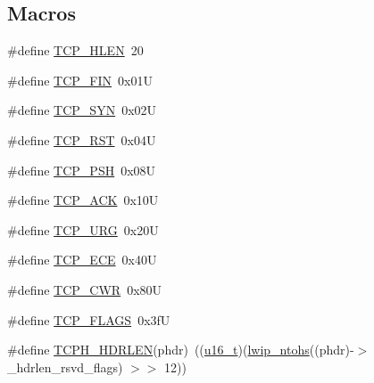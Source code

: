 \subsection*{Macros}
\begin{DoxyCompactItemize}
\item 
\#define \hyperlink{openmote-cc2538_2lwip_2src_2include_2lwip_2prot_2tcp_8h_a5758db371d6daa394d178429b7c94c2a}{T\+C\+P\+\_\+\+H\+L\+EN}~20
\item 
\#define \hyperlink{openmote-cc2538_2lwip_2src_2include_2lwip_2prot_2tcp_8h_a88e60aa2cf23e1c65d630701db08c743}{T\+C\+P\+\_\+\+F\+IN}~0x01U
\item 
\#define \hyperlink{openmote-cc2538_2lwip_2src_2include_2lwip_2prot_2tcp_8h_a6020613f5062417d9811cfa837215c83}{T\+C\+P\+\_\+\+S\+YN}~0x02U
\item 
\#define \hyperlink{openmote-cc2538_2lwip_2src_2include_2lwip_2prot_2tcp_8h_a5ca559def464ef20d8b1f7d32f2f160d}{T\+C\+P\+\_\+\+R\+ST}~0x04U
\item 
\#define \hyperlink{openmote-cc2538_2lwip_2src_2include_2lwip_2prot_2tcp_8h_a1320fd0006a2f70138bc2d0018dda829}{T\+C\+P\+\_\+\+P\+SH}~0x08U
\item 
\#define \hyperlink{openmote-cc2538_2lwip_2src_2include_2lwip_2prot_2tcp_8h_a44b3b1ab31a403ba28ec135adfcbefef}{T\+C\+P\+\_\+\+A\+CK}~0x10U
\item 
\#define \hyperlink{openmote-cc2538_2lwip_2src_2include_2lwip_2prot_2tcp_8h_ac84f499cba8a02fc0e306c10b2acabf0}{T\+C\+P\+\_\+\+U\+RG}~0x20U
\item 
\#define \hyperlink{openmote-cc2538_2lwip_2src_2include_2lwip_2prot_2tcp_8h_ae6ba06711820fc4365ad0d78f70171dd}{T\+C\+P\+\_\+\+E\+CE}~0x40U
\item 
\#define \hyperlink{openmote-cc2538_2lwip_2src_2include_2lwip_2prot_2tcp_8h_a6f441228e74f83c026c48360667beb48}{T\+C\+P\+\_\+\+C\+WR}~0x80U
\item 
\#define \hyperlink{openmote-cc2538_2lwip_2src_2include_2lwip_2prot_2tcp_8h_a75dbc3ac2d65c23a60dbe2f96a874501}{T\+C\+P\+\_\+\+F\+L\+A\+GS}~0x3fU
\item 
\#define \hyperlink{openmote-cc2538_2lwip_2src_2include_2lwip_2prot_2tcp_8h_a5b97d3b7e68c20eb3eab87a61d779223}{T\+C\+P\+H\+\_\+\+H\+D\+R\+L\+EN}(phdr)~((\hyperlink{group__compiler__abstraction_ga77570ac4fcab86864fa1916e55676da2}{u16\+\_\+t})(\hyperlink{openmote-cc2538_2lwip_2src_2include_2lwip_2def_8h_ac642bf6057869696d7807564d8309ffc}{lwip\+\_\+ntohs}((phdr)-\/$>$\+\_\+hdrlen\+\_\+rsvd\+\_\+flags) $>$$>$ 12))
\item 
$$
\end{DoxyCompactItemize}
